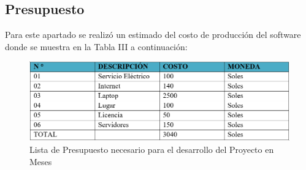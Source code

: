 \documentclass[12pt,a4paper,oneside]{article}
\begin{document}
\subsection{Presupuesto}
Para este apartado se realizó un estimado del costo de producción del software donde se muestra en la Tabla III a continuación:
\begin{figure}[H]
    \centering
    \includegraphics[width=15cm]{Recursos/c.PNG}
    \caption{ Lista de Presupuesto necesario para el desarrollo del Proyecto en Meses}
    \label{fig:budget}
\end{figure}
\newpage

\end{document}
